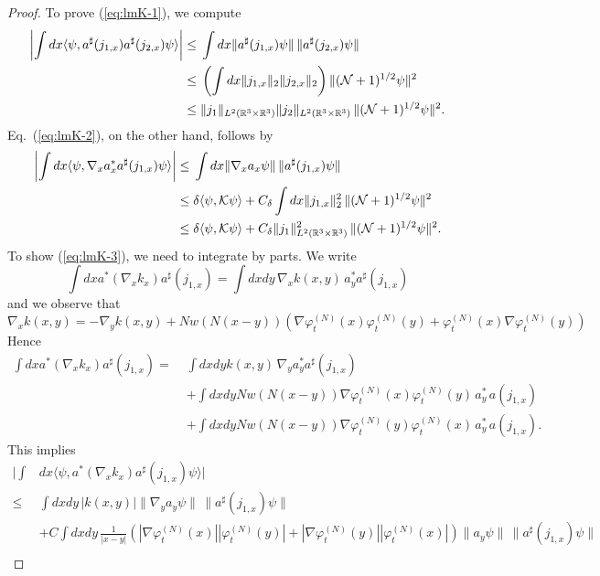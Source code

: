 \documentclass[11pt,a4paper]{article}
\newcommand{\bR}{{\mathbb R}}
\newcommand{\cK}{{\cal K}}
\newcommand{\cN}{{\cal N}}
\begin{document}
\begin{proof}
To prove (\ref{eq:lmK-1}), we compute
\[ \begin{split}  \left| \int dx \langle \psi , a^\sharp (j_{1,x}) a^\sharp (j_{2,x}) \psi \rangle \right|  \leq  \; &\int dx \| a^\sharp (j_{1,x}) \psi \| \, \| a^\sharp (j_{2,x}) \psi \| \\ \leq \; &\left(\int dx \| j_{1,x} \|_2 \| j_{2,x} \|_2\right) \| (\cN+1)^{1/2} \psi \|^2 \\ \leq \; &\| j_1 \|_{L^2 (\bR^3 \times \bR^3)} \| j_2 \|_{L^2 (\bR^3 \times \bR^3)}  \, \| (\cN+1)^{1/2} \psi \|^2. \end{split} \]
Eq.\ (\ref{eq:lmK-2}), on the other hand, follows by
\begin{equation} \begin{split}
\left| \int dx \langle \psi, \nabla_x a_x^* a^\sharp (j_{1,x}) \psi \rangle \right| \leq \; & \int dx \| \nabla_x a_x \psi \| \, \| a^\sharp (j_{1,x}) \psi \| \\ \leq \; &\delta \langle \psi, \cK \psi \rangle + C_\delta  \int dx \| j_{1,x} \|_2^2 \, \| (\cN+1)^{1/2} \psi \|^2 \\ \leq \; & \delta \langle \psi , \cK \psi \rangle + C_\delta \| j_1 \|^2_{L^2 (\bR^3 \times \bR^3)} \, \| (\cN+1)^{1/2} \psi \|^2. \end{split} \end{equation}
To show (\ref{eq:lmK-3}), we need to integrate by parts. We write
\[ \int dx a^* (\nabla_x k_x) a^\sharp (j_{1,x})  = \int dx dy \, \nabla_x k (x,y) \, a^*_y  a^\sharp (j_{1,x}) \]
and we observe that
\[ \nabla_x k(x,y) = - \nabla_y k(x,y) + N w (N (x-y)) \left( \nabla \varphi^{(N)}_t (x) \varphi^{(N)}_t (y) + \varphi_t^{(N)} (x) \nabla \varphi_t^{(N)} (y) \right) \]
Hence
\[\begin{split} 
 \int dx a^* (\nabla_x k_x) a^\sharp (j_{1,x}) = \; & \int dx dy k (x,y) \, \nabla_y a^*_y  a^\sharp (j_{1,x}) 
\\ &+ \int dx dy N w (N (x-y)) \nabla \varphi_t^{(N)} (x) \varphi_t^{(N)} (y) \, a^*_y  \, a(j_{1,x})
\\& + \int dx dy N w (N (x-y)) \nabla \varphi_t^{(N)} (y) \varphi_t^{(N)} (x) \, a^*_y  \, a(j_{1,x}).\end{split} \]
This implies
\[ \begin{split}  \Big|  \int &dx \langle \psi,   a^* (\nabla_x k_x) a^\sharp (j_{1,x}) \psi \rangle \Big| \\ \leq \; & \int dx dy \, |k(x,y)| \| \nabla_y a_y \psi \| \, \| a^\sharp (j_{1,x}) \psi \| \\ &+ C \int dx dy \,  \frac{1}{|x-y|}  \left( |\nabla \varphi_t^{(N)} (x)| |\varphi^{(N)}_t (y)| +|\nabla \varphi_t^{(N)} (y)| |\varphi^{(N)}_t (x)| \right) \| a_y \psi \| \, \| a^\sharp (j_{1,x}) \psi \|  \\ 

\end{split}\]
\end{proof}
\end{document}
